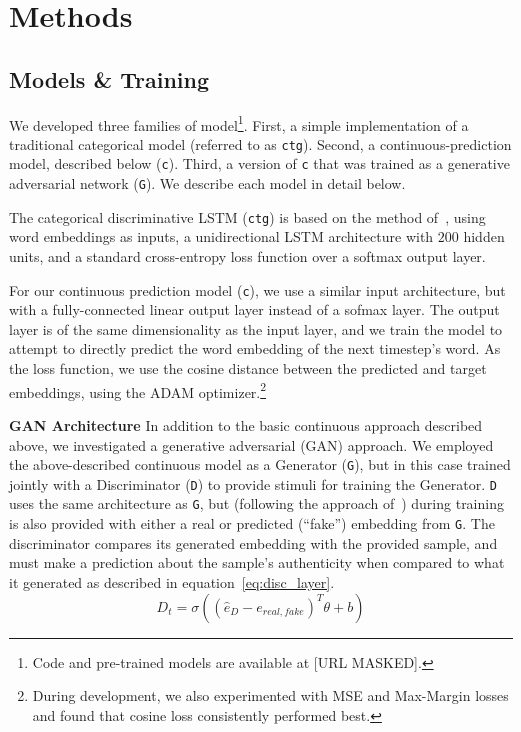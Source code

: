 \documentclass[11pt,a4paper]{article}
\begin{document}


\section{Methods}\label{data}

\subsection{Models \& Training}\label{baseline}

We developed three families of model\footnote{Code and pre-trained models are available at [URL MASKED].}. 
First, a simple implementation of a traditional categorical model (referred to as {\tt ctg}). 
Second, a continuous-prediction model, described below ({\tt c}). 
Third, a version of {\tt c} that was trained as a generative adversarial network ({\tt G}). We describe each model in detail below.

The categorical discriminative LSTM ({\tt ctg}) is based on the method of~\citet{sutskever2011generating}, using word embeddings as inputs, a unidirectional LSTM architecture with $200$ hidden units, and a standard cross-entropy loss function over a softmax output layer. 

For our continuous prediction model ({\tt c}), we use a similar input architecture, but with a fully-connected linear output layer instead of a sofmax layer. 
The output layer is of the same dimensionality as the input layer, and we train the model to attempt to directly predict the word embedding of the next timestep's word. 
As the loss function, we use the cosine distance between the predicted and target embeddings, using the ADAM optimizer.\footnote{During development, we also experimented with MSE and Max-Margin losses and found that cosine loss consistently performed best.}



\noindent
\textbf{GAN Architecture}
In addition to the basic continuous approach described above, we investigated a generative adversarial (GAN) approach. 
We employed the above-described continuous model as a Generator ({\tt G}), but in this case trained jointly with a Discriminator ({\tt D}) to provide stimuli for training the Generator. 
{\tt D} uses the same architecture as {\tt G}, but (following the approach of~\citet{mirza2014conditional}) during training is also provided with either a real or predicted (``fake'') embedding from {\tt G}. The discriminator compares its generated embedding with the provided sample, and must make a prediction about the sample's authenticity when compared to what it generated as described in equation~\ref{eq:disc_layer}.
\begin{equation} \label{eq:disc_layer}
D_t = \sigma \left ( (\hat{e}_D-e_{real,fake})^T \theta + b \right )
\end{equation}
\end{document}
